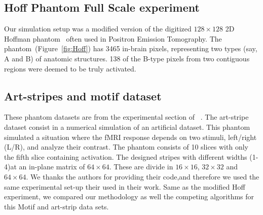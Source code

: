 \begin{comment}

\begin{figure*}[!h]
\begin{center}
\texttt{[image: figures/True\_Negative\_Rate\_Full\_Scale\_Experiments\_All\_Alphas]}
\caption[TrueNegative]{TrueNegative Rate of the AM-FAST, AR-FAST, AS,
  AWS, CT, permutation and TFCE algorithms for the different
  simulation settings. }
  \label{fig:TrueNegative.complete}
\end{center}
\end{figure*}
\end{comment}


\subsection*{Hoff Phantom Full Scale experiment}
Our simulation setup was a modified version of the digitized
$128\!\times\!128$ 2D Hoffman phantom~\citep{hoffmanetal90} often used
in Positron Emission Tomography. The phantom~(Figure~\ref{fig:Hoff})
has 3465 in-brain pixels, representing two types (say, A and B) of
anatomic structures. 138 of the B-type pixels from two contiguous regions were deemed to be truly activated.


\subsection*{Art-stripes and motif dataset}

These phantom datasets are from the experimental section of ~\citep{polzheletal10}. The art-stripe dataset consist in a numerical simulation of an artificial dataset. This phantom simulated a situation where the fMRI response depends on two stimuli, left/right (L/R), and analyze their contrast. The phantom consists of 10 slices with only the fifth slice containing activation. The designed stripes with different widths (1-4)at an in-plane matrix of $64\times 64$. These are divide in $16 \times 16$, $32 \times 32$ and $64 \times 64$. We thanks the authors for providing their code,and therefore we used the same experimental set-up their used in their work. Same as the modified Hoff experiment, we compared our methodology as well the competing algorithms for this Motif and art-strip data sets. 


